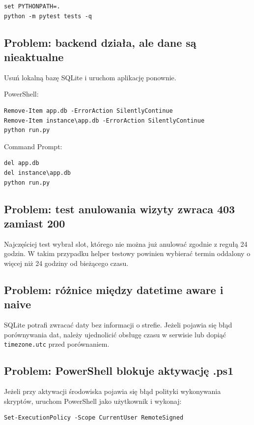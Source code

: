 \documentclass[11pt,a4paper]{article}
\begin{document}
\begin{lstlisting}
set PYTHONPATH=.
python -m pytest tests -q
\end{lstlisting}

\subsection{Problem: backend działa, ale dane są nieaktualne}

Usuń lokalną bazę SQLite i uruchom aplikację ponownie.

PowerShell:

\begin{lstlisting}
Remove-Item app.db -ErrorAction SilentlyContinue
Remove-Item instance\app.db -ErrorAction SilentlyContinue
python run.py
\end{lstlisting}

Command Prompt:

\begin{lstlisting}
del app.db
del instance\app.db
python run.py
\end{lstlisting}

\subsection{Problem: test anulowania wizyty zwraca 403 zamiast 200}

Najczęściej test wybrał slot, którego nie można już anulować zgodnie z regułą 24 godzin. W takim przypadku helper testowy powinien wybierać termin oddalony o więcej niż 24 godziny od bieżącego czasu.

\subsection{Problem: różnice między datetime aware i naive}

SQLite potrafi zwracać daty bez informacji o strefie. Jeżeli pojawia się błąd porównywania dat, należy ujednolicić obsługę czasu w serwisie lub dopiąć \texttt{timezone.utc} przed porównaniem.

\subsection{Problem: PowerShell blokuje aktywację .ps1}

Jeżeli przy aktywacji środowiska pojawia się błąd polityki wykonywania skryptów, uruchom PowerShell jako użytkownik i wykonaj:

\begin{lstlisting}
Set-ExecutionPolicy -Scope CurrentUser RemoteSigned
\end{lstlisting}
\end{document}
